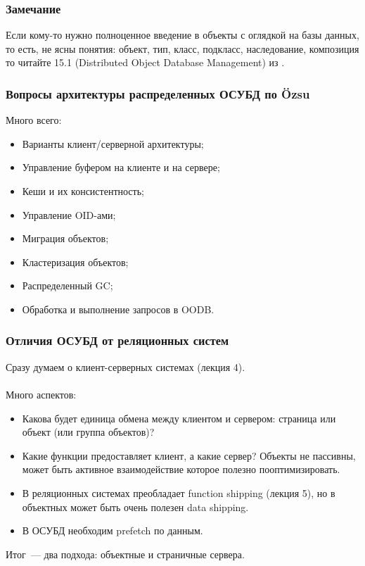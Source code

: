 \documentclass{beamer}
\begin{document}
\begin{frame}
\frametitle{Замечание}

Если кому-то нужно полноценное введение в объекты \alert{с оглядкой на базы данных}, то есть, не ясны понятия: объект, тип, класс, подкласс, наследование, композиция то читайте 15.1 (Distributed Object Database Management) из \cite{Ozsu2011}.

\end{frame}

\begin{frame}
\frametitle{Вопросы архитектуры распределенных ОСУБД по \"{O}zsu}

Много всего:

\begin{itemize}
  \setlength\itemsep{1em}
  \item Варианты клиент/серверной архитектуры;
  \item Управление буфером на клиенте и на сервере;
  \item \alert{Кеши и их консистентность;}
  \item Управление OID-ами;
  \item \alert{Миграция объектов;}
  \item \alert{Кластеризация объектов;}
  \item \alert{Распределенный GC;}
  \item {\color{blue}Обработка и выполнение запросов в OODB.}

\end{itemize}
\end{frame}

\begin{frame}
\frametitle{Отличия ОСУБД от реляционных систем}

Сразу думаем о клиент-серверных системах (лекция 4).
\\~\\
Много аспектов:

\begin{itemize}
  \setlength\itemsep{1em}
  \item Какова будет единица обмена между клиентом и сервером: страница или объект (или группа объектов)?
  \item Какие функции предоставляет клиент, а какие сервер? Объекты не пассивны, может быть активное взаимодействие которое полезно пооптимизировать.
  \item В реляционных системах преобладает function shipping (лекция 5), но в объектных может быть очень полезен data shipping.
  \item В ОСУБД необходим prefetch по данным.
\end{itemize}

Итог~--- два подхода: объектные и страничные сервера.

\end{frame}
\end{document}
